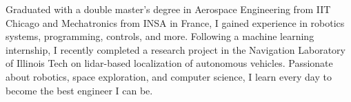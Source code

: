 \documentclass[letter,5pt]{article}
\begin{document}
\small
\justifying
Graduated with a double master’s degree in Aerospace Engineering from IIT Chicago and Mechatronics from INSA in France, I gained experience in robotics systems, programming, controls, and more. Following a machine learning internship, I recently completed a research project in the Navigation Laboratory of Illinois Tech on lidar-based localization of autonomous vehicles. Passionate about robotics, space exploration, and computer science, I learn every day to become the best engineer I can be.
\end{document}

